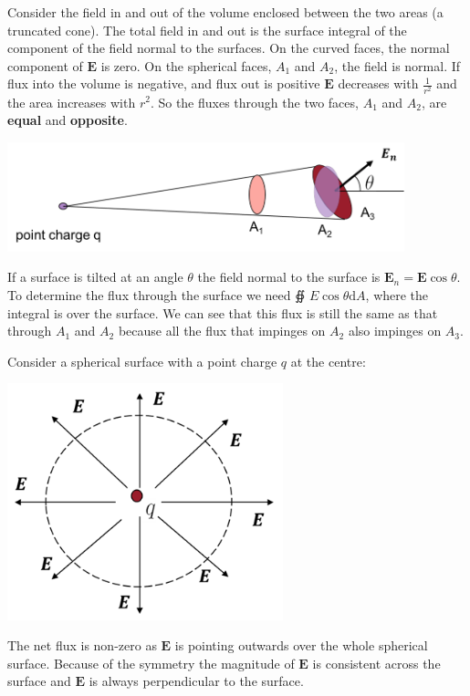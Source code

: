 \documentclass[
]{book}
\begin{document}
Consider the field in and out of the volume enclosed between the two
areas (a truncated cone). The total field in and out is the surface
integral of the component of the field normal to the surfaces. On the
curved faces, the normal component of \(\mathbf{E}\) is zero. On the spherical
faces, \(A_1\) and \(A_2\), the field is normal. If flux into the volume is
negative, and flux out is positive \(\mathbf{E}\) decreases with \(\frac{1}{r^2}\)
and the area increases with \(r^2\). So the fluxes through the two faces,
\(A_1\) and \(A_2\), are \textbf{equal} and \textbf{opposite}.

\includegraphics[width=115mm,height=\textheight]{Figures/elecFlux2.png} \protect\hypertarget{fig:elecFlux2}{}{}

If a surface is tilted at an angle \(\theta\) the field normal to the
surface is \(\mathbf{E}_n = \mathbf{E} \cos\theta\). To determine the flux through the
surface we need ∯ \(E \cos\theta \mathrm{d} A\), where the integral is over
the surface. We can see that this flux is still the same as that through
\(A_1\) and \(A_2\) because all the flux that impinges on \(A_2\) also
impinges on \(A_3\).

Consider a spherical surface with a point charge \(q\) at the centre:

\includegraphics[width=80mm,height=\textheight]{Figures/elecFlux3.png} \protect\hypertarget{fig:elecFlux3}{}{}

The net flux is non-zero as \(\mathbf{E}\) is pointing outwards over the whole
spherical surface. Because of the symmetry the magnitude of \(\mathbf{E}\) is
consistent across the surface and \(\mathbf{E}\) is always perpendicular to the
surface.
\end{document}
